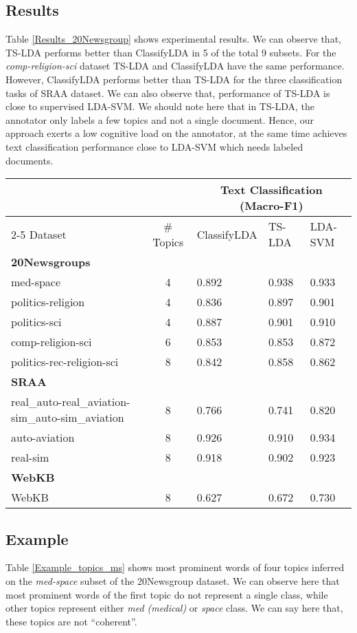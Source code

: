 \documentclass[11pt]{article}
\begin{document}
\subsection{Results}
Table \ref{Results_20Newsgroup} shows experimental results. We can observe that, TS-LDA performs better than ClassifyLDA in 5 of the total 9 subsets. For the \textit{comp-religion-sci} dataset TS-LDA and ClassifyLDA have the same performance. However, ClassifyLDA performs better than TS-LDA for the three classification tasks of SRAA dataset. We can also observe that, performance of TS-LDA is close to supervised LDA-SVM. We should note here that in TS-LDA, the annotator only labels a few topics and not a single document. Hence, our approach exerts a low cognitive load on the annotator, at the same time achieves text classification performance close to LDA-SVM which needs labeled documents.
\begin{table*}[!ht]\small
\centering 
\begin{tabular}{|p{4.5cm}|c|p{1.9cm}|p{1.7cm}|p{2cm}|}
\hline
& &	\multicolumn{3}{c|}{\textbf{Text Classification} (Macro-F1)}	\tabularnewline \cline{2-5}
Dataset	&	\# Topics	&	ClassifyLDA	&	TS-LDA	& 	LDA-SVM	\tabularnewline \hline
\multicolumn{5}{|l|}{\textbf{20Newsgroups}}             \tabularnewline \hline									
med-space	&	4	&	0.892	&	0.938	&	0.933	\tabularnewline \hline
politics-religion	&	4	&	0.836	&	0.897	&	0.901	\tabularnewline \hline
politics-sci	&	4	&	0.887	&	0.901	&	0.910	\tabularnewline \hline
comp-religion-sci	&	6	&	0.853	&	0.853	&	0.872	\tabularnewline \hline
politics-rec-religion-sci	&	8	&	0.842	&	0.858	&	0.862	\tabularnewline \hline
\multicolumn{5}{|l|}{\textbf{SRAA}}             \tabularnewline \hline									
real\_auto-real\_aviation-sim\_auto-sim\_aviation	&	8	&	0.766	&	0.741	&	0.820	\tabularnewline \hline
auto-aviation	&	8	&	0.926	&	0.910	&	0.934	\tabularnewline \hline
real-sim	&	8	&	0.918	&	0.902	&	0.923	\tabularnewline \hline
\multicolumn{5}{|l|}{\textbf{WebKB}}             \tabularnewline \hline									
WebKB	&	8	&	0.627	&	0.672	&	0.730	\tabularnewline \hline
\end{tabular}\caption{Experimental results of text classification on various datasets.}
\label{Results_20Newsgroup} 
\end{table*}
\subsection{Example}
Table \ref{Example_topics_ms} shows most prominent words of four topics inferred on the \textit{med-space} subset of the 20Newsgroup dataset. We can observe here that most prominent words of the first topic do not represent a single class, while other topics represent either \textit{med (medical)} or \textit{space} class. We can say here that, these topics are not ``coherent''.
\end{document}
